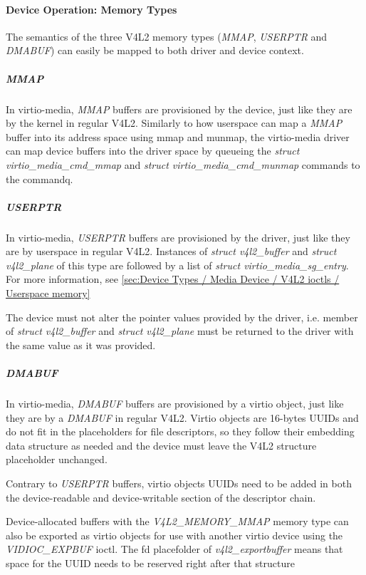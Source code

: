 \paragraph{Device Operation: Memory Types}

The semantics of the three V4L2 memory types (\textit{MMAP}, \textit{USERPTR}
and \textit{DMABUF}) can easily be mapped to both driver and device context.

\subparagraph{MMAP}

In virtio-media, \textit{MMAP} buffers are provisioned by the device, just like
they are by the kernel in regular V4L2. Similarly to how userspace can map a
\textit{MMAP} buffer into its address space using mmap and munmap, the
virtio-media driver can map device buffers into the driver space by queueing the
\textit{struct virtio_media_cmd_mmap} and \textit{struct virtio_media_cmd_munmap}
commands to the commandq.

\subparagraph{USERPTR}

In virtio-media, \textit{USERPTR} buffers are provisioned by the driver, just
like they are by userspace in regular V4L2. Instances of \textit{struct v4l2_buffer}
and \textit{struct v4l2_plane} of this type are followed by a list of
\textit{struct virtio_media_sg_entry}. For more information, see
\ref{sec:Device Types / Media Device / V4L2 ioctls / Userspace memory}

The device must not alter the pointer values provided by the driver, i.e.
 member of \textit{struct v4l2_buffer} and
\textit{struct v4l2_plane} must be returned to the driver with the same value
as it was provided.

\subparagraph{DMABUF}

In virtio-media, \textit{DMABUF} buffers are provisioned by a virtio object,
just like they are by a \textit{DMABUF} in regular V4L2. Virtio objects are
16-bytes UUIDs and do not fit in the placeholders for file descriptors, so
they follow their embedding data structure as needed and the device must
leave the V4L2 structure placeholder unchanged.

Contrary to \textit{USERPTR} buffers, virtio objects UUIDs need to be added in
both the device-readable and device-writable section of the descriptor chain.

Device-allocated buffers with the \textit{V4L2_MEMORY_MMAP} memory type can also
be exported as virtio objects for use with another virtio device using the
\textit{VIDIOC_EXPBUF} ioctl. The fd placefolder of \textit{v4l2_exportbuffer}
means that space for the UUID needs to be reserved right after that structure

